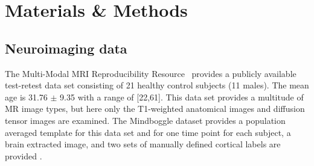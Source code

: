 \documentclass{frontiersSCNS} %
\begin{document}




\section{Materials \& Methods}

\subsection{Neuroimaging data}
The Multi-Modal MRI Reproducibility Resource~\citep{Landman2011}
provides a publicly available test-retest data set consisting of 21
healthy control subjects (11 males). The mean
age is 31.76 $\pm$ 9.35 with a range of [22,61]. This data set provides a
multitude of MR image types, but here only the T1-weighted anatomical images and diffusion
tensor images are examined.  The Mindboggle dataset provides a
population averaged template for this data set and for one time point
for each subject, a brain extracted image, and two sets of manually
defined cortical labels are provided \citep{Klein2012}.
\end{document}
